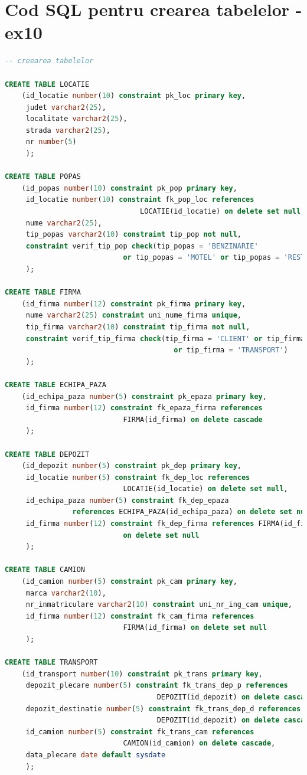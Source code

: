 \documentclass[12pt, a4paper]{article}
\begin{document}
\newpage
\section{Cod SQL pentru crearea tabelelor - ex10}
\begin{lstlisting}[language=SQL]
-- creearea tabelelor

CREATE TABLE LOCATIE
    (id_locatie number(10) constraint pk_loc primary key,
     judet varchar2(25),
     localitate varchar2(25),
     strada varchar2(25),
     nr number(5)
     );

CREATE TABLE POPAS
    (id_popas number(10) constraint pk_pop primary key,
     id_locatie number(10) constraint fk_pop_loc references
                                LOCATIE(id_locatie) on delete set null,
     nume varchar2(25),
     tip_popas varchar2(10) constraint tip_pop not null,
     constraint verif_tip_pop check(tip_popas = 'BENZINARIE'
                            or tip_popas = 'MOTEL' or tip_popas = 'RESTAURANT')
     );

CREATE TABLE FIRMA
    (id_firma number(12) constraint pk_firma primary key,
     nume varchar2(25) constraint uni_nume_firma unique,
     tip_firma varchar2(10) constraint tip_firma not null,
     constraint verif_tip_firma check(tip_firma = 'CLIENT' or tip_firma = 'PAZA'
                                        or tip_firma = 'TRANSPORT')
     );

CREATE TABLE ECHIPA_PAZA
    (id_echipa_paza number(5) constraint pk_epaza primary key,
     id_firma number(12) constraint fk_epaza_firma references
                            FIRMA(id_firma) on delete cascade
     );

CREATE TABLE DEPOZIT
    (id_depozit number(5) constraint pk_dep primary key,
     id_locatie number(5) constraint fk_dep_loc references
                            LOCATIE(id_locatie) on delete set null,
     id_echipa_paza number(5) constraint fk_dep_epaza
                references ECHIPA_PAZA(id_echipa_paza) on delete set null,
     id_firma number(12) constraint fk_dep_firma references FIRMA(id_firma)
                            on delete set null
     );

CREATE TABLE CAMION
    (id_camion number(5) constraint pk_cam primary key,
     marca varchar2(10),
     nr_inmatriculare varchar2(10) constraint uni_nr_ing_cam unique,
     id_firma number(12) constraint fk_cam_firma references
                            FIRMA(id_firma) on delete set null
     );

CREATE TABLE TRANSPORT
    (id_transport number(10) constraint pk_trans primary key,
     depozit_plecare number(5) constraint fk_trans_dep_p references
                                    DEPOZIT(id_depozit) on delete cascade,
     depozit_destinatie number(5) constraint fk_trans_dep_d references
                                    DEPOZIT(id_depozit) on delete cascade,
     id_camion number(5) constraint fk_trans_cam references
                            CAMION(id_camion) on delete cascade,
     data_plecare date default sysdate
     );


\end{lstlisting}
\end{document}
